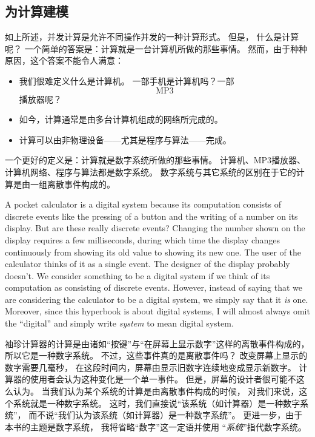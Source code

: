 \documentclass[fleqn,leqno]{article}
\begin{document}
\begin{cn}
\subsection{为计算建模} \label{sec:computing-devices}

如上所述，并发计算是允许不同操作并发的一种计算形式。
但是，
%
什么是计算呢？
一个简单的答案是：计算就是一台计算机所做的那些事情。
然而，由于种种原因，这个答案不能令人满意：
\begin{itemize}
  \item 我们很难定义什么是计算机。
    一部手机是计算机吗？一部$$\text{MP3}$$ 播放器呢？
  \item 如今，计算通常是由多台计算机组成的网络所完成的。
  \item 计算可以由非物理设备——尤其是程序与算法——完成。
\end{itemize}
一个更好的定义是：计算就是数字系统所做的那些事情。
计算机、$\text{MP3}$播放器、计算机网络、程序与算法都是数字系统。
数字系统与其它系统的区别在于它的计算是由一组离散事件构成的。
\end{cn}

\begin{en}
A pocket calculator is a digital system because its computation
consists of discrete events like the pressing of a button and the
writing of a number on its display.  But are these really discrete
events?  Changing the number shown on the display requires a few
milliseconds, during which time the display changes continuously from
showing its old value to showing its new one.  The user of the
calculator thinks of it as a single event.  The designer of the
display probably doesn't.  We consider something to be a digital
system if we think of its computation as consisting of discrete
events.  However, instead of saying that we are considering the
calculator to be a digital system, we simply say that it \emph{is}
one.  Moreover, since this hyperbook is about digital systems, I will
almost always omit the ``digital'' and simply write 
\emph{system} to mean digital system.
\end{en}

\begin{ch}
  袖珍计算器的计算是由诸如``按键''与``在屏幕上显示数字''这样的离散事件构成的，
  所以它是一种数字系统。
  不过，这些事件真的是离散事件吗？
  改变屏幕上显示的数字需要几毫秒，
  在这段时间内，屏幕由显示旧数字连续地变成显示新数字。
  计算器的使用者会认为这种变化是一个单一事件。
  但是，屏幕的设计者很可能不这么认为。
  当我们认为某个系统的计算是由离散事件构成的时候，
  对我们来说，这个系统就是一种数字系统。
  这时，我们直接说``该系统（如计算器）是一种数字系统''，
  而不说``我们认为该系统（如计算器）是一种数字系统''。
  更进一步，由于本书的主题是数字系统，
  我将省略``数字''这一定语并使用%
  ``\emph{系统}''指代数字系统。
\end{ch}
\end{document}
